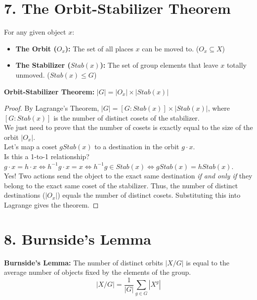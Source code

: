 \documentclass[12pt]{article}
\begin{document}
\section*{7. The Orbit-Stabilizer Theorem}

For any given object $x$:
\begin{itemize}
    \item \textbf{The Orbit ($O_x$):} The set of all places $x$ can be moved to. ($O_x \subseteq X$)
    \item \textbf{The Stabilizer ($Stab(x)$):} The set of group elements that leave $x$ totally unmoved. ($Stab(x) \leq G$)
\end{itemize}

\begin{mdframed}
    \textbf{Orbit-Stabilizer Theorem:} $|G| = |O_x| \times |Stab(x)|$
\end{mdframed}

\begin{proof}
    By Lagrange's Theorem, $|G| = [G:Stab(x)] \times |Stab(x)|$, where $[G:Stab(x)]$ is the number of distinct cosets of the stabilizer. \\
    We just need to prove that the number of cosets is exactly equal to the size of the orbit $|O_x|$. \\
    Let's map a coset $gStab(x)$ to a destination in the orbit $g \cdot x$. \\
    Is this a 1-to-1 relationship? \\
    $g \cdot x = h \cdot x \iff h^{-1}g \cdot x = x \iff h^{-1}g \in Stab(x) \iff gStab(x) = hStab(x)$. \\
    Yes! Two actions send the object to the exact same destination \textit{if and only if} they belong to the exact same coset of the stabilizer. Thus, the number of distinct destinations ($|O_x|$) equals the number of distinct cosets. Substituting this into Lagrange gives the theorem.
\end{proof}

\section*{8. Burnside's Lemma}

\begin{mdframed}
    \textbf{Burnside's Lemma:} The number of distinct orbits $|X/G|$ is equal to the average number of objects fixed by the elements of the group.
    $$ |X/G| = \frac{1}{|G|} \sum_{g \in G} |X^g| $$
\end{mdframed}
\end{document}
